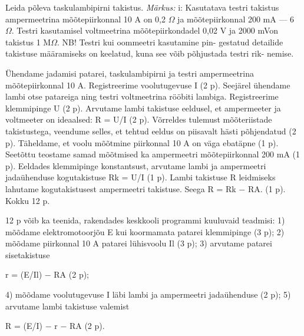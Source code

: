 
Leida põleva taskulambipirni takistus.
\textit{Märkus:} i: Kasutatava testri takistus ampermeetrina mõõtepiirkonnal 10 A on 0,2 $\Omega$ ja mõõtepiirkonnal 200 mA --- 6 $\Omega$. Testri kasutamisel voltmeetrina mõõtepiirkondadel 0,02 V ja 2000 mVon takistus 1 M$\Omega$. NB! Testri kui oommeetri kasutamine pin- gestatud detailide takistuse määramiseks on keelatud, kuna see võib põhjustada testri rik- nemise.

\hint

\solu
Ühendame jadamisi patarei, taskulambipirni ja testri ampermeetrina mõõtepiirkonnal 10 A. Registreerime voolutugevuse I (2 p). Seejärel ühendame lambi otse patareiga ning testri voltmeetrina rööbiti lambiga. Registreerime klemmipinge U (2 p). Arvutame lambi takistuse eeldusel, et ampermeeter ja voltmeeter on ideaalsed: R = U/I (2 p). Võrreldes tulemust mõõteriistade takistustega, veendume selles, et tehtud eeldus on piisavalt hästi põhjendatud (2 p). Täheldame, et voolu mõõtmine piirkonnal 10 A on väga ebatäpne (1 p). Seetõttu teostame samad mõõtmised ka ampermeetri mõõtepiirkonnal 200 mA (1 p). Eeldades klemmipinge konstantsust, arvutame lambi ja ampermeetri jadaühenduse kogutakistuse Rk = U/I (1 p). Lambi takistuse R leidmiseks lahutame kogutakistusest ampermeetri takistuse. Seega R = Rk $-$ RA. (1 p). Kokku 12 p.

12 p võib ka teenida, rakendades keskkooli programmi kuuluvaid teadmisi: 1) mõõdame elektromotoorjõu E kui koormamata patarei klemmipinge (3 p); 2) mõõdame piirkonnal 10 A patarei lühisvoolu Il (3 p); 3) arvutame patarei sisetakistuse

r = (E/Il) $-$ RA (2 p);

4) mõõdame voolutugevuse I läbi lambi ja ampermeetri jadaühenduse (2 p); 5) arvutame lambi takistuse valemist

R = (E/I) $-$ r $-$ RA (2 p).
\probend
